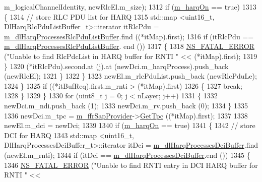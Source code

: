\begin{DoxyCode}
      m\_logicalChannelIdentity, newRlcEl.m\_size);
1312                   \textcolor{keywordflow}{if} (\hyperlink{classns3_1_1PfFfMacScheduler_a20ee9882187d440870b2a88b63fcb7e9}{m\_harqOn} == \textcolor{keyword}{true})
1313                     \{
1314                       \textcolor{comment}{// store RLC PDU list for HARQ}
1315                       std::map <uint16\_t, DlHarqRlcPduListBuffer\_t>::iterator itRlcPdu =  
      \hyperlink{classns3_1_1PfFfMacScheduler_acf9952b5bb3d26644b5e25054ca6e385}{m\_dlHarqProcessesRlcPduListBuffer}.find ((*itMap).first);
1316                       \textcolor{keywordflow}{if} (itRlcPdu == \hyperlink{classns3_1_1PfFfMacScheduler_acf9952b5bb3d26644b5e25054ca6e385}{m\_dlHarqProcessesRlcPduListBuffer}.
      end ())
1317                         \{
1318                           \hyperlink{group__fatal_ga5131d5e3f75d7d4cbfd706ac456fdc85}{NS\_FATAL\_ERROR} (\textcolor{stringliteral}{"Unable to find RlcPdcList in HARQ buffer for RNTI 
      "} << (*itMap).first);
1319                         \}
1320                       (*itRlcPdu).second.at (j).at (newDci.m\_harqProcess).push\_back (newRlcEl);
1321                     \}
1322                 \}
1323               newEl.m\_rlcPduList.push\_back (newRlcPduLe);
1324             \}
1325           \textcolor{keywordflow}{if} ((*itBufReq).first.m\_rnti > (*itMap).first)
1326             \{
1327               \textcolor{keywordflow}{break};
1328             \}
1329         \}
1330       \textcolor{keywordflow}{for} (uint8\_t j = 0; j < nLayer; j++)
1331         \{
1332           newDci.m\_ndi.push\_back (1);
1333           newDci.m\_rv.push\_back (0);
1334         \}
1335 
1336       newDci.m\_tpc = \hyperlink{classns3_1_1PfFfMacScheduler_a40519746bd3f39a4b664db3036f2e3fd}{m\_ffrSapProvider}->\hyperlink{classns3_1_1LteFfrSapProvider_a0021d72c12fdaddd3817ef0eb5a7cd4e}{GetTpc} ((*itMap).first);
1337 
1338       newEl.m\_dci = newDci;
1339 
1340       \textcolor{keywordflow}{if} (\hyperlink{classns3_1_1PfFfMacScheduler_a20ee9882187d440870b2a88b63fcb7e9}{m\_harqOn} == \textcolor{keyword}{true})
1341         \{
1342           \textcolor{comment}{// store DCI for HARQ}
1343           std::map <uint16\_t, DlHarqProcessesDciBuffer\_t>::iterator itDci = 
      \hyperlink{classns3_1_1PfFfMacScheduler_af3c0c393dc246b7b6a907539362c935b}{m\_dlHarqProcessesDciBuffer}.find (newEl.m\_rnti);
1344           \textcolor{keywordflow}{if} (itDci == \hyperlink{classns3_1_1PfFfMacScheduler_af3c0c393dc246b7b6a907539362c935b}{m\_dlHarqProcessesDciBuffer}.end ())
1345             \{
1346               \hyperlink{group__fatal_ga5131d5e3f75d7d4cbfd706ac456fdc85}{NS\_FATAL\_ERROR} (\textcolor{stringliteral}{"Unable to find RNTI entry in DCI HARQ buffer for RNTI "} << 

\end{DoxyCode}
